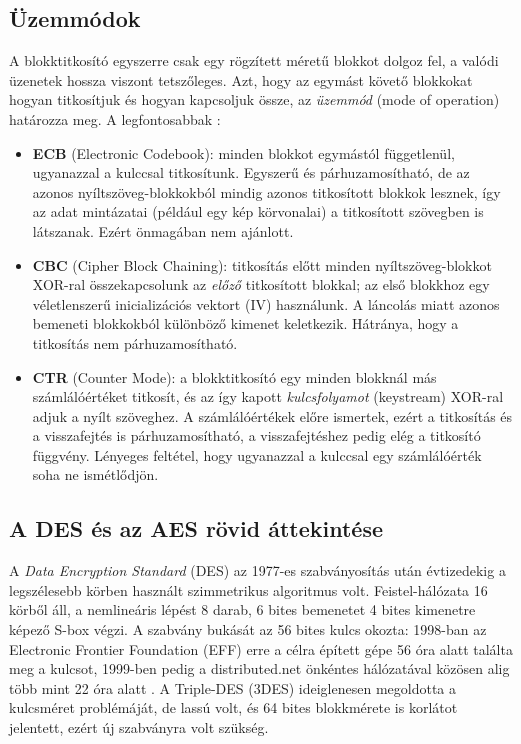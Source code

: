 \documentclass[a4paper,12pt]{report}
\theoremstyle{definition}
\theoremstyle{remark}
\begin{document}
\subsection{Üzemmódok}\label{sec:uzemmodok}

A blokktitkosító egyszerre csak egy rögzített méretű blokkot dolgoz fel, a valódi üzenetek hossza viszont tetszőleges. Azt, hogy az egymást követő blokkokat hogyan titkosítjuk és hogyan kapcsoljuk össze, az \emph{üzemmód} (mode of operation) határozza meg. A legfontosabbak \cite{Stallings2017}:

\begin{itemize}
	\item \textbf{ECB} (Electronic Codebook): minden blokkot egymástól függetlenül, ugyanazzal a kulccsal titkosítunk. Egyszerű és párhuzamosítható, de az azonos nyíltszöveg-blokkokból mindig azonos titkosított blokkok lesznek, így az adat mintázatai (például egy kép körvonalai) a titkosított szövegben is látszanak. Ezért önmagában nem ajánlott.
	\item \textbf{CBC} (Cipher Block Chaining): titkosítás előtt minden nyíltszöveg-blokkot XOR-ral összekapcsolunk az \emph{előző} titkosított blokkal; az első blokkhoz egy véletlenszerű inicializációs vektort (IV) használunk. A láncolás miatt azonos bemeneti blokkokból különböző kimenet keletkezik. Hátránya, hogy a titkosítás nem párhuzamosítható.
	\item \textbf{CTR} (Counter Mode): a blokktitkosító egy minden blokknál más számlálóértéket titkosít, és az így kapott \emph{kulcsfolyamot} (keystream) XOR-ral adjuk a nyílt szöveghez. A számlálóértékek előre ismertek, ezért a titkosítás és a visszafejtés is párhuzamosítható, a visszafejtéshez pedig elég a titkosító függvény. Lényeges feltétel, hogy ugyanazzal a kulccsal egy számlálóérték soha ne ismétlődjön.
\end{itemize}

\subsection{A DES és az AES rövid áttekintése}

A \emph{Data Encryption Standard} (DES) az 1977-es szabványosítás után évtizedekig a legszélesebb körben használt szimmetrikus algoritmus volt. Feistel-hálózata 16 körből áll, a nemlineáris lépést 8 darab, 6 bites bemenetet 4 bites kimenetre képező S-box végzi. A szabvány bukását az 56 bites kulcs okozta: 1998-ban az Electronic Frontier Foundation (EFF) erre a célra épített gépe 56 óra alatt találta meg a kulcsot, 1999-ben pedig a distributed.net önkéntes hálózatával közösen alig több mint 22 óra alatt \cite{Paar2010}. A Triple-DES (3DES) ideiglenesen megoldotta a kulcsméret problémáját, de lassú volt, és 64 bites blokkmérete is korlátot jelentett, ezért új szabványra volt szükség.
\end{document}
